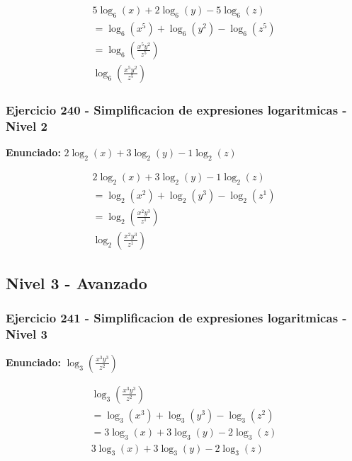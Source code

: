 \documentclass[12pt,a4paper]{article}
\begin{document}
\[
\begin{aligned}
5\log_{6}\left(x\right)+2\log_{6}\left(y\right)-5\log_{6}\left(z\right)\\
=\log_{6}\left(x^{5}\right)+\log_{6}\left(y^{2}\right)-\log_{6}\left(z^{5}\right)\\
=\log_{6}\left(\frac{x^{5}y^{2}}{z^{5}}\right)\\
\boxed{\log_{6}\left(\frac{x^{5}y^{2}}{z^{5}}\right)}
\end{aligned}
\]


\subsubsection*{Ejercicio 240 - Simplificacion de expresiones logaritmicas - Nivel 2}
\textbf{Enunciado:} \(2\log_{2}\left(x\right)+3\log_{2}\left(y\right)-1\log_{2}\left(z\right)\)

\[
\begin{aligned}
2\log_{2}\left(x\right)+3\log_{2}\left(y\right)-1\log_{2}\left(z\right)\\
=\log_{2}\left(x^{2}\right)+\log_{2}\left(y^{3}\right)-\log_{2}\left(z^{1}\right)\\
=\log_{2}\left(\frac{x^{2}y^{3}}{z^{1}}\right)\\
\boxed{\log_{2}\left(\frac{x^{2}y^{3}}{z^{1}}\right)}
\end{aligned}
\]


\newpage

\subsection*{Nivel 3 - Avanzado}

\subsubsection*{Ejercicio 241 - Simplificacion de expresiones logaritmicas - Nivel 3}
\textbf{Enunciado:} \(\log_{3}\left(\frac{x^{3}y^{3}}{z^{2}}\right)\)

\[
\begin{aligned}
\log_{3}\left(\frac{x^{3}y^{3}}{z^{2}}\right)\\
=\log_{3}\left(x^{3}\right)+\log_{3}\left(y^{3}\right)-\log_{3}\left(z^{2}\right)\\
=3\log_{3}\left(x\right)+3\log_{3}\left(y\right)-2\log_{3}\left(z\right)\\
\boxed{3\log_{3}\left(x\right)+3\log_{3}\left(y\right)-2\log_{3}\left(z\right)}
\end{aligned}
\]
\end{document}
